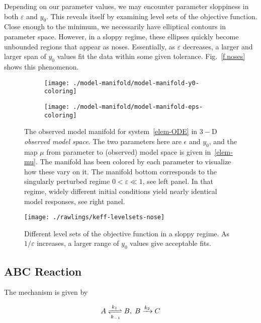 \documentclass[11pt]{article}
\newcommand{\eps}{\varepsilon}
\begin{document}
Depending on our parameter values, we may encounter parameter
sloppiness in both $\eps$ and $y_0$. This reveals itself by examining
level sets of the objective function. Close enough to the minimum, we
necessarily have elliptical contours in parameter space. However, in a
sloppy regime, these ellipses quickly become unbounded regions that
appear as noses. Essentially, as $\eps$ decreases, a larger and larger
span of $y_0$ values fit the data within some given
tolerance. Fig.~\ref{f.noses} shows this phenomenon.

\begin{figure}[ht!]
  \begin{subfigure}[t]{0.49\textwidth}
    \centering
    \texttt{[image: ./model-manifold/model-manifold-y0-coloring]}
  \end{subfigure}
  \begin{subfigure}[t]{0.49\textwidth}
    \centering
    \texttt{[image: ./model-manifold/model-manifold-eps-coloring]}
  \end{subfigure} %
  \caption{The observed model manifold for
    system~\eqref{elem-ODE} in $3-$D \emph{observed model space}. The
    two parameters here are $\epsilon$ and $y_0$, and the map $\mu$
    from parameter to (observed) model space is given
    in~\eqref{elem-mu}. The manifold has been colored by each
    parameter to visualize how these vary on it. The manifold bottom
    corresponds to the singularly perturbed regime $0 < \eps \ll 1$,
    see left panel. In that regime, widely different initial
    conditions yield nearly identical model responses, see right
    panel. \label{f.elem.ex.1}}
\end{figure}

\begin{figure}[htbp]
  \centering
  \texttt{[image: ./rawlings/keff-levelsets-nose]}
  \caption{Different level sets of the objective function in a sloppy
    regime. As $1/\eps$ increases, a larger range of $y_0$ values give
    acceptable fits.}
\end{figure}

\subsection{ABC Reaction}

The mechanism is given by

\begin{align*}
  A \xrightleftharpoons[k_{-1}]{k_1} B, \; B \xrightarrow[]{k_2} C
\end{align*}
\end{document}
